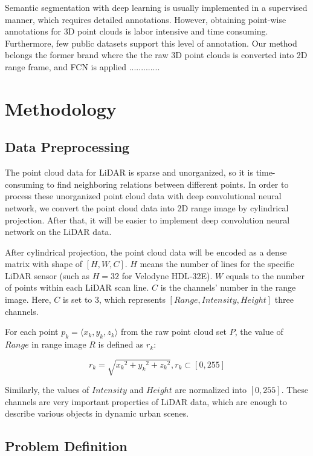 	Semantic segmentation with deep learning is usually implemented in a supervised manner, which requires detailed annotations. However, obtaining point-wise annotations for 3D point clouds is labor intensive and time consuming. Furthermore, few public datasets support this level of annotation. Our method belongs the former brand where the the raw 3D point clouds is converted into 2D range frame, and FCN is applied .............
	
	\section{Methodology}
	
	\subsection{Data Preprocessing}
	The point cloud data for LiDAR is sparse and unorganized, so it is time-consuming to find neighboring relations between different points. In order to process these unorganized point cloud data with deep convolutional neural network, we convert the point cloud data into 2D range image by cylindrical projection. After that, it will be easier to implement deep convolution neural network on the LiDAR data.
	
	After cylindrical projection, the point cloud data will be encoded as a dense matrix with shape of $[H,W,C]$. $H$ means the number of lines for the specific LiDAR sensor (such as $H=32$ for Velodyne HDL-32E). $W$ equals to the number of points within each LiDAR scan line. $C$ is the channels' number in the range image. Here, $C$ is set to 3, which represents $[Range,Intensity,Height]$ three channels.
	
	For each point $p_k=\langle x_k,y_k,z_k\rangle$ from the raw point cloud set $P$, the value of $Range$ in range image $R$ is defined as $r_k$:
	
	\begin{equation}
	r_k=\sqrt{{x_k}^2+{y_k}^2+{z_k}^2},  r_k\subset [0,255]	
	\end{equation} 
	
	Similarly, the values of $Intensity$ and $Height$ are normalized into $[0,255]$. These channels are very important properties of LiDAR data, which are enough to describe various objects in dynamic urban scenes.
	
	\subsection{Problem Definition}
	
